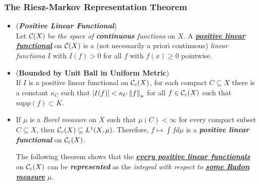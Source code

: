 \documentclass[11pt]{article}
\begin{document}
\subsubsection{The Riesz-Markov Representation Theorem}
\begin{itemize}
\item \begin{definition} (\emph{\textbf{Positive Linear Functional}})\\
Let ${\mathcal C}(X)$ be \emph{the space of \textbf{continuous} functions} on $X$. A \underline{\textbf{\emph{positive linear functional}}} on ${\mathcal C}(X)$ is a (not necessarily a 
priori continuous) \emph{linear functiona} $I$ with $I(f) > 0$ for all $f$  with $f(x) \ge 0$ pointwise. 
\end{definition}

\item \begin{lemma} (\textbf{Bounded by Unit Ball in Uniform Metric}) \citep{folland2013real}\\
If $I$ is a positive linear functional on ${\mathcal C}_{c}(X)$, for each compact $C \subseteq X$ there is a constant $\kappa_{C}$ such that $\left\lvert I(f) \right\rvert < \kappa_C\left\|f\right\|_{u}$ for all $f \in {\mathcal C}_{c}(X)$ such that $\text{supp}(f) \subset K$.
\end{lemma}


\item \begin{remark}
If $\mu$ is a \emph{Borel measure} on $X$ such that $\mu(C) < \infty$ for every compact subset $C \subseteq X$, then ${\mathcal C}_c(X) \subseteq L^1(X, \mu)$. Therefore, $f \mapsto \int f d\mu$ is a \emph{\textbf{positive linear functional}} on ${\mathcal C}_c(X)$.

The following theorem shows that the \underline{\emph{\textbf{every positive linear functionals}}} on ${\mathcal C}_c(X)$ can be \emph{\textbf{represented}} as the \emph{integral} \emph{with respect to \underline{\textbf{some Radon measure}}} $\mu$.
\end{remark}


\end{itemize}
\end{document}
